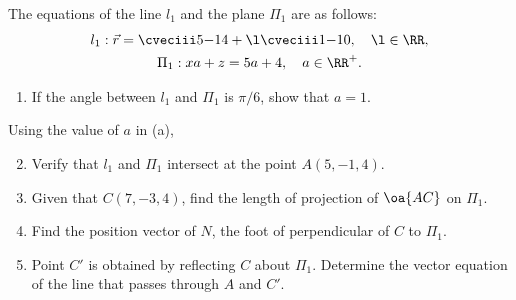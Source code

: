 \begin{problem}
    The equations of the line $l_1$ and the plane $\Pi_1$ are as follows:
    \begin{gather*}
        l_1 : \vec r = \cveciii5{-1}4 + \l \cveciii1{-1}0, \quad \l \in \RR, \\
        \Pi_1 : xa + z = 5a + 4, \quad a \in \RR^+.
    \end{gather*}

    \begin{enumerate}
        \item If the angle between $l_1$ and $\Pi_1$ is $\pi/6$, show that $a = 1$.
    \end{enumerate}

    Using the value of $a$ in (a),

    \begin{enumerate}
        \setcounter{enumi}{1}
        \item Verify that $l_1$ and $\Pi_1$ intersect at the point $A(5, -1, 4)$.
        \item Given that $C(7, -3, 4)$, find the length of projection of $\oa{AC}$ on $\Pi_1$.
        \item Find the position vector of $N$, the foot of perpendicular of $C$ to $\Pi_1$.
        \item Point $C'$ is obtained by reflecting $C$ about $\Pi_1$. Determine the vector equation of the line that passes through $A$ and $C'$.
    \end{enumerate}
\end{problem}
